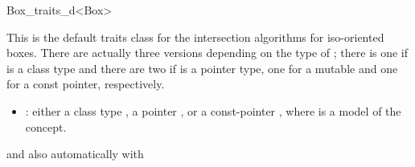 
\begin{ccRefClass}{Box_traits_d<Box>}

\ccDefinition

This is the default traits class for the intersection algorithms for
iso-oriented boxes. There are actually three versions depending on the
type of ; there is one if  is a class type and there are
two if  is a pointer type, one for a mutable and one for a const
pointer, respectively.

\begin{itemize}
  \item
    : either a class type , a pointer , or a
    const-pointer , where  is a model of the
     concept.
\end{itemize}

and also automatically with\\

\ccIsModel


\ccCreation
{}


\ccSeeAlso

\\
\\

\\

\end{ccRefClass}
